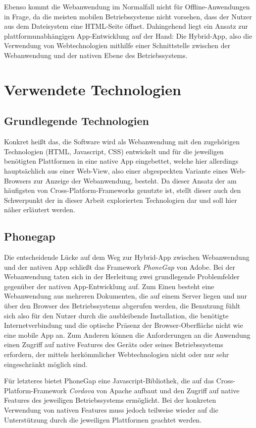 \documentclass[bibtotoc]{scrreprt}
\begin{document}
Ebenso kommt die Webanwendung im Normalfall nicht für Offline-Anwendungen in Frage, da die meisten mobilen Betriebssysteme nicht vorsehen, dass der Nutzer aus dem Dateisystem eine HTML-Seite öffnet.  
Dahingehend liegt ein Ansatz zur plattformunabhängigen App-Entwicklung auf der Hand: Die Hybrid-App, also die Verwendung von Webtechnologien mithilfe einer Schnittstelle zwischen der Webanwendung und der nativen Ebene des Betriebssystems.

\section{Verwendete Technologien}
\subsection{Grundlegende Technologien}
Konkret heißt das, die Software wird als Webanwendung mit den zugehörigen Technologien (HTML, Javascript, CSS) entwickelt und für die jeweiligen benötigten Plattformen in eine native App eingebettet, welche hier allerdings hauptsächlich aus einer Web-View, also einer abgespeckten Variante eines Web-Browsers zur Anzeige der Webanwendung, besteht. Da dieser Ansatz der am häufigsten von Cross-Platform-Frameworks genutzte ist,  stellt dieser auch den Schwerpunkt der in dieser Arbeit explorierten Technologien dar und soll hier näher erläutert werden. 

\subsection{Phonegap}
Die entscheidende Lücke auf dem Weg zur Hybrid-App zwischen Webanwendung und der nativen App schließt das Framework \emph{PhoneGap} von Adobe. 
Bei der Webanwendung taten sich in der Herleitung zwei grundlegende Problemfelder gegenüber der nativen App-Entwicklung auf. 
Zum Einen besteht eine Webanwendung aus mehreren Dokumenten, die auf einem Server liegen und nur über den Browser des Betriebssystems abgerufen werden, die Benutzung fühlt sich also für den Nutzer durch die ausbleibende Installation, die benötigte Internetverbindung und die optische Präsenz der Browser-Oberfläche nicht wie eine mobile App an. 
Zum Anderen können die Anforderungen an die Anwendung einen Zugriff auf native Features des Geräts oder seines Betriebssystems erfordern, der mittels herkömmlicher Webtechnologien nicht oder nur sehr eingeschränkt möglich sind. 

Für letzteres bietet PhoneGap eine Javascript-Bibliothek, die auf das Cross-Platform-Framework \emph{Cordova} von Apache aufbaut und den Zugriff auf native Features des jeweiligen Betriebssystems ermöglicht.
Bei der konkreten Verwendung von nativen Features muss jedoch teilweise wieder auf die Unterstützung durch die jeweiligen Plattformen geachtet werden.
\end{document}

